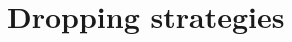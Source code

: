 \documentclass[numbers,webpdf,imanum]{ima-authoring-template}%
\theoremstyle{thmstyletwo}%
\numberwithin{equation}{section}
\begin{document}
\section{Dropping strategies}\label{sec:dropping}
\end{document}

